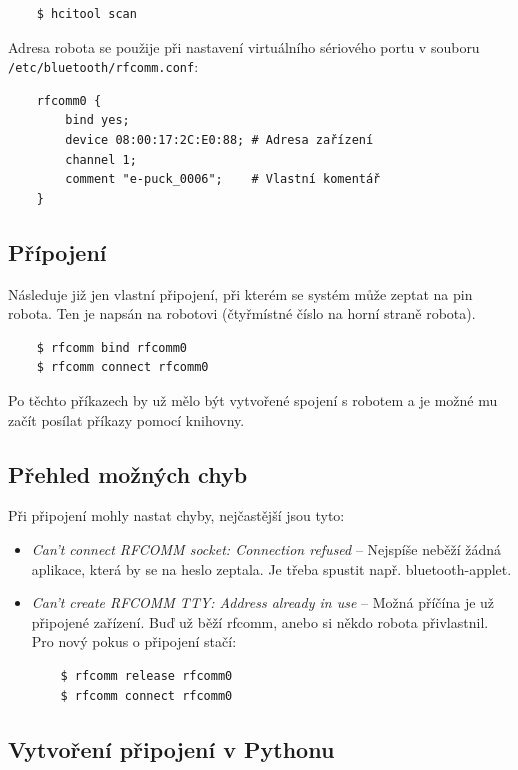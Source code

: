 \documentclass[12pt,notitlepage]{report}
\begin{document}
    \begin{verbatim}
    $ hcitool scan
    \end{verbatim}

    Adresa robota se použije při nastavení virtuálního sériového portu v souboru {\tt /etc/bluetooth/rfcomm.conf}:

    \begin{verbatim}
    rfcomm0 {
        bind yes;
        device 08:00:17:2C:E0:88; # Adresa zařízení
        channel 1;
        comment "e-puck_0006";    # Vlastní komentář
    }
    \end{verbatim}

    \subsection{Přípojení}
    Následuje již jen vlastní připojení, při kterém se systém může zeptat na
    pin robota. Ten je napsán na robotovi (čtyřmístné číslo na horní straně
    robota).

    \begin{verbatim}
    $ rfcomm bind rfcomm0
    $ rfcomm connect rfcomm0
    \end{verbatim}

    Po těchto příkazech by už mělo být vytvořené spojení s robotem a je možné
    mu začít posílat příkazy pomocí knihovny.

    \subsection{Přehled možných chyb}
    Při připojení mohly nastat chyby, nejčastější jsou tyto:
    \begin{itemize}
    \item{{\em Can't connect RFCOMM socket: Connection refused} -- Nejspíše neběží žádná aplikace, která by se na heslo zeptala. Je třeba spustit např. bluetooth-applet.}
    \item{{\em Can't create RFCOMM TTY: Address already in use} -- Možná příčína je už připojené zařízení. Buď už běží rfcomm, anebo si
        někdo robota přivlastnil. Pro nový pokus o připojení stačí:
            \begin{verbatim}
    $ rfcomm release rfcomm0
    $ rfcomm connect rfcomm0
            \end{verbatim}
    }
    \end{itemize}

    \subsection{Vytvoření připojení v Pythonu}
\end{document}
